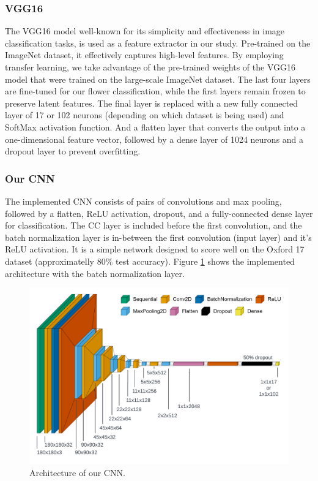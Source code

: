 \subsubsection{VGG16}
The VGG16 model \cite{SimonyanVGG} well-known for its simplicity and effectiveness in image classification tasks, is used as a feature extractor in our study. Pre-trained on the ImageNet dataset, it effectively captures high-level features.
By employing transfer learning, we take advantage of the pre-trained weights of the VGG16 model that were trained on the large-scale ImageNet dataset.
The last four layers are fine-tuned for our flower classification, while the first layers remain frozen to preserve latent features. The final layer is replaced with a new fully connected layer of 17 or 102 neurons (depending on which dataset is being used) and SoftMax activation function.
And a flatten layer that converts the output into a one-dimensional feature vector, followed by a dense layer of 1024 neurons and a dropout layer to prevent overfitting.

\subsubsection{Our CNN}

The implemented \gls{CNN} consists of pairs of convolutions and max pooling, followed by a flatten, ReLU activation, dropout, and a fully-connected dense layer for classification.
The \gls{CC} layer is included before the first convolution, and the batch normalization layer is in-between the first convolution (input layer) and it's ReLU activation.
It is a simple network designed to score well on the Oxford 17 dataset (approximatelly $80\%$ test accuracy). Figure \ref{fig:our_cnn} shows the implemented architecture with the batch normalization layer.


\begin{figure}[ht]
    \centering
    \includegraphics[width=\textwidth]{images/ours_architecture.png}
    \caption{Architecture of our CNN.}
    \label{fig:our_cnn}
\end{figure}